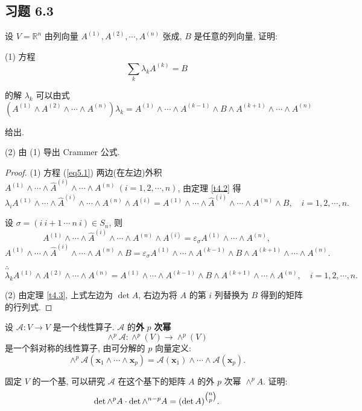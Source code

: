 \documentclass{ctexart}
\begin{document}
\subsection{习题 6.3}
\begin{exercise}%
    设 $V=\mathbb{R}^n$ 由列向量 $A^{(1)},A^{(2)},\cdots,A^{(n)}$ 张成, $B$ 是任意的列向量, 证明:
    
    (1) 方程
    \begin{equation}\label{eq5.1}
        \sum\limits_k\lambda_kA^{(k)}=B
    \end{equation}

    的解 $\lambda_k$ 可以由式
    \[(A^{(1)}\wedge A^{(2)}\wedge\cdots\wedge A^{(n)})\lambda_k=A^{(1)}\wedge\cdots\wedge A^{(k-1)}\wedge B\wedge A^{(k+1)}\wedge\cdots\wedge A^{(n)}\]

    给出.

    (2) 由 (1) 导出 Crammer 公式.
\end{exercise}
\begin{proof}
    (1) 方程 (\ref{eq5.1}) 两边(在左边)外积 $A^{(1)}\wedge\cdots\wedge\widehat{A}^{(i)}\wedge\cdots\wedge A^{(n)}\ (i=1,2,\cdots,n)$, 由定理 \ref{t4.2} 得
    \[\lambda_iA^{(1)}\wedge\cdots\wedge\widehat{A}^{(i)}\wedge\cdots\wedge A^{(n)}\wedge A^{(i)}=A^{(1)}\wedge\cdots\wedge\widehat{A}^{(i)}\wedge\cdots\wedge A^{(n)}\wedge B,\quad i=1,2,\cdots,n.\]

    设 $\sigma=(i\ i+1\ \cdots\ n\ i)\in S_n$, 则
    \[A^{(1)}\wedge\cdots\wedge\widehat{A}^{(i)}\wedge\cdots\wedge A^{(n)}\wedge A^{(i)}=\varepsilon_\sigma A^{(1)}\wedge\cdots\wedge A^{(n)},\]
    \[A^{(1)}\wedge\cdots\wedge\widehat{A}^{(i)}\wedge\cdots\wedge A^{(n)}\wedge B=\varepsilon_\sigma A^{(1)}\wedge\cdots\wedge A^{(k-1)}\wedge B\wedge A^{(k+1)}\wedge\cdots\wedge A^{(n)}.\]

    $\therefore$
    \[\lambda_kA^{(1)}\wedge A^{(2)}\wedge\cdots\wedge A^{(n)}=A^{(1)}\wedge\cdots\wedge A^{(k-1)}\wedge B\wedge A^{(k+1)}\wedge\cdots\wedge A^{(n)},\quad i=1,2,\cdots,n.\]

    (2) 由定理 \ref{t4.3}, 上式左边为 $\det A$, 右边为将 $A$ 的第 $i$ 列替换为 $B$ 得到的矩阵的行列式.
\end{proof}
\begin{exercise}%
    设 $\mathcal{A}:V\to V$ 是一个线性算子. $\mathcal{A}$ 的\textbf{外} $p$ \textbf{次幂}
    \[\wedge^p\mathcal{A}:\wedge^p(V)\to\wedge^p(V)\]
    是一个斜对称的线性算子, 由可分解的 $p$ 向量定义:
    \[\wedge^p\mathcal{A}(\boldsymbol{x}_1\wedge\cdots\wedge\boldsymbol{x}_p)=\mathcal{A}(\boldsymbol{x}_1)\wedge\cdots\wedge\mathcal{A}(\boldsymbol{x}_p).\]

    固定 $V$ 的一个基, 可以研究 $\mathcal{A}$ 在这个基下的矩阵 $A$ 的外 $p$ 次幂 $\wedge^pA$. 证明:
    \[\det\wedge^pA\cdot\det\wedge^{n-p}A=(\det A)^{\tbinom{n}{p}}.\]
\end{exercise}
\end{document}
